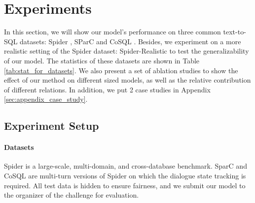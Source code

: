 \documentclass[11pt]{article}
\begin{document}
\begin{table}
\caption{Results on Spider-Realistic dataset. We reproduce \citet{scholak-etal-2021-picard} 's method to get the performance of T5-3B (+PICARD) and the performance of RAT-SQL+STRUG are from \citet{deng-etal-2021-structure} reported.}
\label{tab:spider_realistic}
\end{table}

\section{Experiments}
In this section, we will show our model's performance on three common text-to-SQL datasets: Spider \citep{yu-etal-2018-spider}, SParC \citep{yu-etal-2019-sparc} and CoSQL \citep{yu-etal-2019-cosql}. Besides, we experiment on a more realistic setting of the Spider dataset: Spider-Realistic \citep{deng-etal-2021-structure} to test the generalizability of our model. The statistics of these datasets are shown in Table \ref{tab:stat_for_datasets}. We also present a set of ablation studies to show the effect of our method on different sized models, as well as the relative contribution of different relations. In addition, we put 2 case studies in Appendix \ref{sec:appendix_case_study}.

\subsection{Experiment Setup}





\paragraph{Datasets} Spider is a large-scale, multi-domain, and cross-database benchmark. SparC and CoSQL are multi-turn versions of Spider on which the dialogue state tracking is required. All test data is hidden to ensure fairness, and we submit our model to the organizer of the challenge for evaluation.
\end{document}
